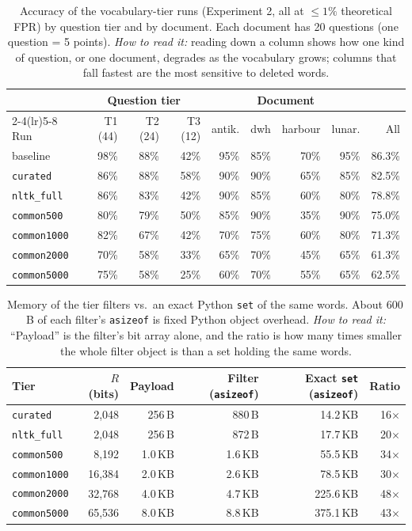\documentclass[11pt]{article}
\newcommand{\code}[1]{\texttt{#1}}
\begin{document}
\begin{table}[h]
\centering
\small
\begin{tabular}{@{}lrrrrrrrr@{}}
\toprule
 & \multicolumn{3}{c}{Question tier} & \multicolumn{4}{c}{Document} & \\
\cmidrule(lr){2-4}\cmidrule(lr){5-8}
Run & T1 (44) & T2 (24) & T3 (12) & antik. & dwh & harbour & lunar. & All \\
\midrule
baseline           & 98\% & 88\% & 42\% & 95\% & 85\% & 70\% & 95\% & 86.3\% \\
\code{curated}     & 86\% & 88\% & 58\% & 90\% & 90\% & 65\% & 85\% & 82.5\% \\
\code{nltk\_full}  & 86\% & 83\% & 42\% & 90\% & 85\% & 60\% & 80\% & 78.8\% \\
\code{common500}   & 80\% & 79\% & 50\% & 85\% & 90\% & 35\% & 90\% & 75.0\% \\
\code{common1000}  & 82\% & 67\% & 42\% & 70\% & 75\% & 60\% & 80\% & 71.3\% \\
\code{common2000}  & 70\% & 58\% & 33\% & 65\% & 70\% & 45\% & 65\% & 61.3\% \\
\code{common5000}  & 75\% & 58\% & 25\% & 60\% & 70\% & 55\% & 65\% & 62.5\% \\
\bottomrule
\end{tabular}
\caption{Accuracy of the vocabulary-tier runs (Experiment 2, all at $\le 1\%$ theoretical FPR) by
question tier and by document. Each document has 20 questions (one question = 5 points). \emph{How to read it:} reading down a
column shows how one kind of question, or one document, degrades as the vocabulary grows; columns
that fall fastest are the most sensitive to deleted words.}
\label{tab:qtier}
\end{table}

\begin{table}[h]
\centering
\small
\begin{tabular}{@{}lrrrrr@{}}
\toprule
Tier & $R$ (bits) & Payload & Filter (\code{asizeof}) & Exact \code{set} (\code{asizeof}) & Ratio \\
\midrule
\code{curated}    & 2{,}048  & 256\,B   & 880\,B    & 14.2\,KB  & 16$\times$ \\
\code{nltk\_full} & 2{,}048  & 256\,B   & 872\,B    & 17.7\,KB  & 20$\times$ \\
\code{common500}  & 8{,}192  & 1.0\,KB  & 1.6\,KB   & 55.5\,KB  & 34$\times$ \\
\code{common1000} & 16{,}384 & 2.0\,KB  & 2.6\,KB   & 78.5\,KB  & 30$\times$ \\
\code{common2000} & 32{,}768 & 4.0\,KB  & 4.7\,KB   & 225.6\,KB & 48$\times$ \\
\code{common5000} & 65{,}536 & 8.0\,KB  & 8.8\,KB   & 375.1\,KB & 43$\times$ \\
\bottomrule
\end{tabular}
\caption{Memory of the tier filters vs.\ an exact Python \code{set} of the same words. About 600\,B of
each filter's \code{asizeof} is fixed Python object overhead. \emph{How to read it:} ``Payload''
is the filter's bit array alone, and the ratio is how many times smaller the whole filter object is
than a set holding the same words.}
\label{tab:memory}
\end{table}
\end{document}
